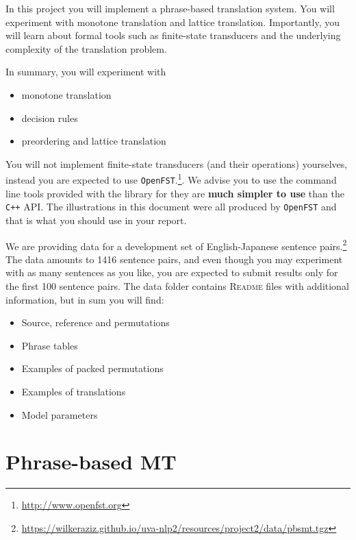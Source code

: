 
In this project you will implement a phrase-based translation system.
You will experiment with monotone translation and lattice translation.
Importantly, you will learn about formal tools such as finite-state transducers and the underlying complexity of the translation problem.

In summary, you will experiment with

\begin{itemize}
	\item monotone translation
	\item decision rules
	\item preordering and lattice translation
\end{itemize}

You will not implement finite-state transducers (and their operations) yourselves, instead you are expected to use \texttt{OpenFST}.\footnote{\url{http://www.openfst.org}}.
We advise you to use the command line tools provided with the library for they are {\bf much simpler to use} than the \texttt{C++} API.
The illustrations in this document were all produced by \texttt{OpenFST} and that is what you should use in your report.

We are providing data for a development set of English-Japanese sentence pairs.\footnote{\url{https://wilkeraziz.github.io/uva-nlp2/resources/project2/data/pbsmt.tgz}} The data amounts to 1416 sentence pairs, and even though you may experiment with as many sentences as you like, you are expected to submit results only for the first 100 sentence pairs. 
The data folder contains \textsc{Readme} files with additional information, but in sum you will find:
\begin{itemize}
	\item Source, reference and permutations
	\item Phrase tables
	\item Examples of packed permutations
	\item Examples of translations
	\item Model parameters
\end{itemize}


\section{Phrase-based MT}


